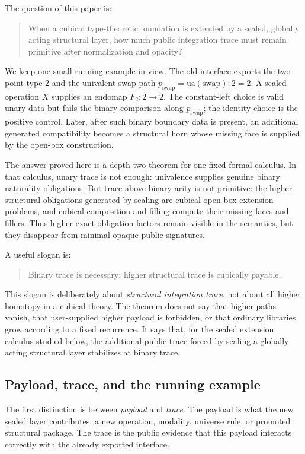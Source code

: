 \documentclass{lmcs}
\begin{document}
The question of this paper is:
\begin{quote}
When a cubical type-theoretic foundation is extended by a sealed, globally acting
structural layer, how much public integration trace must remain primitive after
normalization and opacity?
\end{quote}

We keep one small running example in view.  The old interface exports the
two-point type \(2\) and the univalent swap path
\(p_{\mathrm{swap}}=\mathrm{ua}(\mathrm{swap}):2=2\).  A sealed operation
\(X\) supplies an endomap \(F_2:2\to2\).  The constant-left choice is valid
unary data but fails the binary comparison along \(p_{\mathrm{swap}}\); the
identity choice is the positive control.  Later, after such binary boundary data
is present, an additional generated compatibility becomes a structural horn
whose missing face is supplied by the open-box construction.

The answer proved here is a depth-two theorem for one fixed formal calculus.  In
that calculus, unary trace is not enough: univalence supplies genuine binary
naturality obligations.  But trace above binary arity is not primitive: the
higher structural obligations generated by sealing are cubical open-box extension
problems, and cubical composition and filling compute their missing faces and
fillers.  Thus higher exact obligation factors remain visible in the semantics,
but they disappear from minimal opaque public signatures.

A useful slogan is:
\begin{quote}
Binary trace is necessary; higher structural trace is cubically payable.
\end{quote}

This slogan is deliberately about \emph{structural integration trace}, not about
all higher homotopy in a cubical theory.  The theorem does not say that higher
paths vanish, that user-supplied higher payload is forbidden, or that ordinary
libraries grow according to a fixed recurrence.  It says that, for the sealed
extension calculus studied below, the additional public trace forced by sealing a
globally acting structural layer stabilizes at binary trace.

\subsection{Payload, trace, and the running example}

The first distinction is between \emph{payload} and \emph{trace}.  The payload is
what the new sealed layer contributes: a new operation, modality, universe rule,
or promoted structural package.  The trace is the public evidence that this
payload interacts correctly with the already exported interface.
\end{document}
